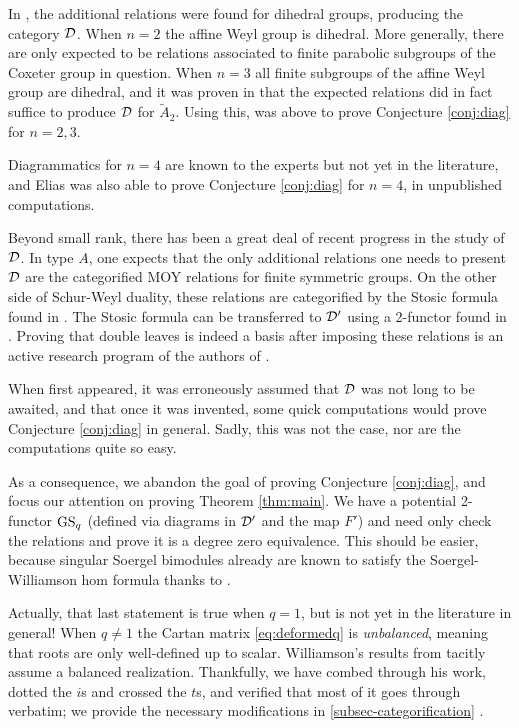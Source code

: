 {In \cite{ECathedral}, the additional relations were found for dihedral groups, producing the category $\mathcal{D}$. When $n= 2$ the affine Weyl group is dihedral. More generally, there are only expected to be relations associated to finite parabolic subgroups of the Coxeter group in question. When $n=3$ all finite subgroups of the affine Weyl group are dihedral, and it was proven in \cite[Appendix]{EQuantumI} that the expected relations did in fact suffice to produce $\mathcal{D}$ for $\tilde{A}_{2}$. Using this, \cite{EQuantumI} was above to prove Conjecture \ref{conj:diag} for $n=2, 3$. 

\begin{remark} Diagrammatics for $n=4$ are known to the experts but not yet in the literature, and Elias was also able to prove Conjecture \ref{conj:diag} for $n=4$, in unpublished computations. \end{remark}

Beyond small rank, there has been a great deal of recent progress in the study of $\mathcal{D}$. In type $A$, one expects that the only additional relations one needs to present $\mathcal{D}$ are the categorified MOY relations for finite symmetric groups. On the other side of Schur-Weyl duality, these relations are categorified by the Stosic formula found in \cite{KLMS}. The Stosic formula can be transferred to $\mathcal{D}'$ using a 2-functor found in \cite{ELosev}. Proving that double leaves is indeed a basis after imposing these relations is an active research program of the authors of \cite{EKLP}.

When \cite{EQuantumI} first appeared, it was erroneously assumed that $\mathcal{D}$ was not long to be awaited, and that once it was invented, some quick computations would prove Conjecture \ref{conj:diag} in general. Sadly, this was not the case, nor are  the computations quite so easy.

As a consequence, we abandon the goal of proving Conjecture \ref{conj:diag}, and focus our attention on proving Theorem \ref{thm:main}. We have a potential 2-functor $\operatorname{GS}_q$ (defined via diagrams in $\mathcal{D}'$ and the map $F'$) and need only check the relations and prove it is a degree zero equivalence. This should be easier, because singular Soergel bimodules already are known to satisfy the Soergel-Williamson hom formula thanks to .

Actually, that last statement is true when $q=1$, but is not yet in the literature in general! When $q \ne 1$ the Cartan matrix \eqref{eq:deformedq} is \emph{unbalanced}, meaning that roots are only well-defined up to scalar. Williamson's results from \cite{WillSingular} tacitly assume a balanced realization. Thankfully, we have combed through his work, dotted the $i$s and crossed the $t$s, and verified that most of it goes through verbatim; we provide the necessary modifications in \cref{subsec-categorification} .




}
